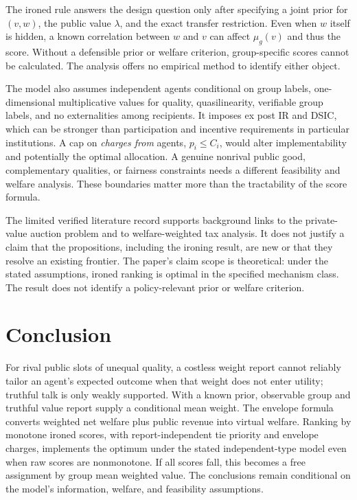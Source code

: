 \documentclass[11pt]{article}
\begin{document}
The ironed rule answers the design question only after specifying a joint prior for $(v,w)$, the public value $\lambda$, and the exact transfer restriction. Even when $w$ itself is hidden, a known correlation between $w$ and $v$ can affect $\mu_g(v)$ and thus the score. Without a defensible prior or welfare criterion, group-specific scores cannot be calculated. The analysis offers no empirical method to identify either object.

The model also assumes independent agents conditional on group labels, one-dimensional multiplicative values for quality, quasilinearity, verifiable group labels, and no externalities among recipients. It imposes ex post IR and DSIC, which can be stronger than participation and incentive requirements in particular institutions. A cap on \emph{charges from} agents, $p_i\le C_i$, would alter implementability and potentially the optimal allocation. A genuine nonrival public good, complementary qualities, or fairness constraints needs a different feasibility and welfare analysis. These boundaries matter more than the tractability of the score formula.

The limited verified literature record supports background links to the private-value auction problem and to welfare-weighted tax analysis. It does not justify a claim that the propositions, including the ironing result, are new or that they resolve an existing frontier. The paper's claim scope is theoretical: under the stated assumptions, ironed ranking is optimal in the specified mechanism class. The result does not identify a policy-relevant prior or welfare criterion.

\section{Conclusion}

For rival public slots of unequal quality, a costless weight report cannot reliably tailor an agent's expected outcome when that weight does not enter utility; truthful talk is only weakly supported. With a known prior, observable group and truthful value report supply a conditional mean weight. The envelope formula converts weighted net welfare plus public revenue into virtual welfare. Ranking by monotone ironed scores, with report-independent tie priority and envelope charges, implements the optimum under the stated independent-type model even when raw scores are nonmonotone. If all scores fall, this becomes a free assignment by group mean weighted value. The conclusions remain conditional on the model's information, welfare, and feasibility assumptions.
\end{document}
